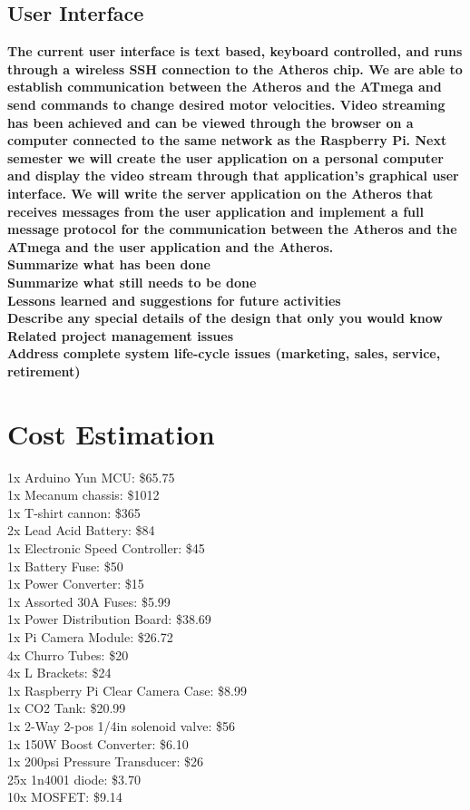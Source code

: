 \documentclass[letterpaper,12pt]{article}
\newcommand{\xxx}[1]{{\color{red}\bf #1}}
\begin{document}
\subsection{User Interface}
\xxx{The current user interface is text based, keyboard controlled, and runs
through a wireless SSH connection to the Atheros chip. We are able to establish
communication between the Atheros and the ATmega and send commands to change
desired motor velocities. Video streaming has been achieved and can be viewed
through the browser on a computer connected to the same network as the
Raspberry Pi. Next semester we will create the user application on a personal
computer and display the video stream through that application’s graphical user
interface. We will write the server application on the Atheros that receives
messages from the user application and implement a full message protocol for
the communication between the Atheros and the ATmega and the user application
and the Atheros.}\\

\xxx{Summarize what has been done} \\
\xxx{Summarize what still needs to be done} \\
\xxx{Lessons learned and suggestions for future activities} \\
\xxx{Describe any special details of the design that only you would know} \\
\xxx{Related project management issues} \\
\xxx{Address complete system life-cycle issues (marketing, sales, service, retirement)}

\section{Cost Estimation}
\label{sec:cost}
1x Arduino Yun MCU: \$65.75 \\
1x Mecanum chassis: \$1012 \\
1x T-shirt cannon: \$365 \\
2x Lead Acid Battery: \$84 \\
1x Electronic Speed Controller: \$45 \\
1x Battery Fuse: \$50 \\
1x Power Converter: \$15 \\
1x Assorted 30A Fuses: \$5.99 \\
1x Power Distribution Board: \$38.69 \\
1x Pi Camera Module: \$26.72 \\
4x Churro Tubes: \$20 \\
4x L Brackets: \$24 \\
1x Raspberry Pi Clear Camera Case: \$8.99 \\
1x CO2 Tank: \$20.99 \\
1x 2-Way 2-pos 1/4in solenoid valve: \$56 \\
1x 150W Boost Converter: \$6.10 \\
1x 200psi Pressure Transducer: \$26 \\
25x 1n4001 diode: \$3.70 \\
10x MOSFET: \$9.14 \\
\end{document}

